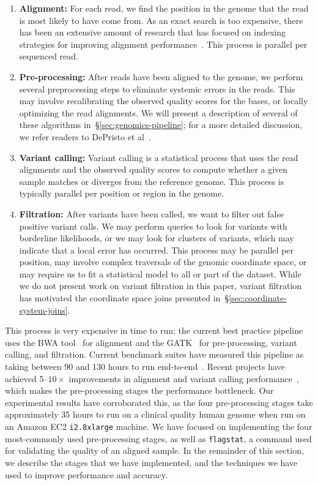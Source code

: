 \documentclass{acm_proc_article-sp}
\begin{document}
\begin{enumerate}
\item \textbf{Alignment:} For each read, we find the position in the genome that the read is most likely to
have come from. As an exact search is too expensive, there has been an extensive amount of research
that has focused on indexing strategies for improving alignment performance~\cite{li10, li11,
zaharia11}. This process is parallel per sequenced read.
\item \textbf{Pre-processing:} After reads have been aligned to the genome, we perform several
preprocessing steps to eliminate systemic errors in the reads. This may involve recalibrating the
observed quality scores for the bases, or locally optimizing the read alignments. We will present a
description of several of these algorithms in~\S\ref{sec:genomics-pipeline}; for a more detailed
discussion, we refer readers to DePristo et al~\cite{depristo11}.
\item \textbf{Variant calling:} Variant calling is a statistical process that uses the read alignments
and the observed quality scores to compute whether a given sample \linebreak matches or diverges
from the reference genome. This process is typically parallel per position or region in the genome.
\item \textbf{Filtration:} After variants have been called, we want to filter out false positive variant calls.
We may perform queries to look for variants with borderline likelihoods, or we may look for clusters of
variants, which may indicate that a local error has occurred. This process may be parallel per position,
may involve complex traversals of the genomic coordinate space, or may require us to fit a statistical
model to all or part of the dataset. While we do not present work on variant filtration in this paper, variant
filtration has motivated the coordinate space joins presented in~\S\ref{sec:coordinate-system-joins}.
\end{enumerate}

This process is very expensive in time to run; the current best practice pipeline uses the BWA tool~\cite{li10} for
alignment and the GATK~\cite{depristo11, mckenna10} for pre-processing, variant calling, and filtration.
Current benchmark suites have measured this pipeline as taking between 90 and 130 hours to run
end-to-end~\cite{talwalkar14}. Recent projects have achieved 5--$10\times$ improvements in alignment
and variant calling performance~\cite{rimmer14, zaharia11}, which makes the pre-processing stages
the performance bottleneck. Our experimental results have corroborated this, as the four pre-processing stages
take approximately 35 hours to run on a clinical quality human genome when run on an Amazon EC2 \texttt{i2.8xlarge}
machine. We have focused on implementing the four most-commonly used pre-processing stages, as well as
\texttt{flagstat}, a command used for validating the quality of an aligned sample. In the remainder of this section,
we describe the stages that we have implemented, and the techniques we have used to improve performance and
accuracy.
\end{document}

